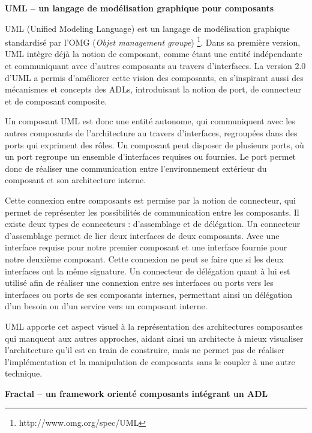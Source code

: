           \textbf{UML -- un langage de modélisation graphique pour composants}
      
      UML (Unified Modeling Language) est un langage de modélisation graphique standardisé par l'OMG (\emph{Objet management groupe}) \footnote{http://www.omg.org/spec/UML}. Dans sa première version, UML intègre déjà la notion de composant, comme étant une entité indépendante et communiquant avec d'autres composants au travers d'interfaces. La version 2.0 d'UML \cite{specificationuml} a permis d'améliorer cette vision des composants, en s'inspirant aussi des mécanismes et concepts des ADLs, introduisant la notion de port, de connecteur et de composant composite.

Un composant UML est donc une entité autonome, qui communiquent avec les autres composants de l'architecture au travers d'interfaces, regroupées dans des ports qui expriment des rôles. Un composant peut disposer de plusieurs ports, où un port regroupe un ensemble d'interfaces requises ou fournies. Le port permet donc de réaliser une communication entre l'environnement extérieur du composant et son architecture interne. 
      
 Cette connexion entre composants est permise par la notion de connecteur, qui permet de représenter les possibilités de communication entre les composants. Il existe deux types de connecteurs : d’assemblage et de délégation. Un connecteur d'assemblage permet de lier deux interfaces de deux composants. Avec une interface requise pour notre premier composant et une interface fournie pour notre deuxième composant. Cette connexion ne peut se faire que si les deux interfaces ont la même signature. Un connecteur de délégation quant à lui est utilisé afin de réaliser une connexion entre ses interfaces ou ports vers les interfaces ou ports de ses composants internes, permettant ainsi un délégation d'un besoin ou d'un service vers un composant interne.
        
    UML apporte cet aspect visuel à la représentation des architectures composantes qui manquent aux autres approches, aidant ainsi un architecte à mieux visualiser l'architecture qu'il est en train de construire, mais ne permet pas de réaliser l'implémentation et la manipulation de composants sans le coupler à une autre technique. \\\par 
    
        \textbf{Fractal -- un framework orienté composants intégrant un ADL}
        

